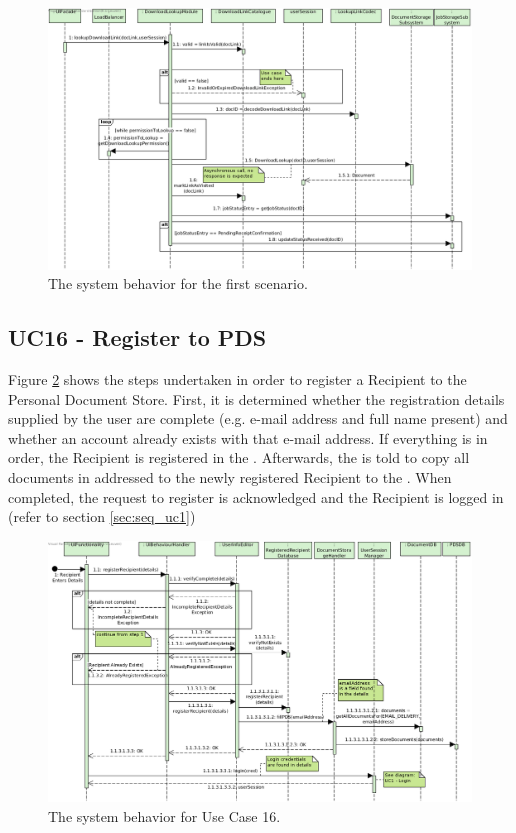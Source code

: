 \begin{figure}[!htp]
    \centering
    \includegraphics[width=\textwidth]{figures/UC15 - Download document via unique link.png}
    \caption{The system behavior for the first scenario.
        }\label{fig:seq_uc15}
\end{figure}

\subsection{UC16 - Register to PDS}
Figure \ref{fig:seq_uc16} shows the steps undertaken in order to register a Recipient to the Personal Document Store. First, it is determined whether the registration details supplied by the user are complete (e.g. e-mail address and full name present) and whether an account already exists with that e-mail address. If everything is in order, the Recipient is registered in the . Afterwards, the  is told to copy all documents in  addressed to the newly registered Recipient to the . When completed, the request to register is acknowledged and the Recipient is logged in (refer to section \ref{sec:seq_uc1})

\begin{figure}[!htp]
    \centering
    \includegraphics[width=\textwidth]{figures/UC16 - Register to PDS.png}
    \caption{The system behavior for Use Case 16.
        }\label{fig:seq_uc16}
\end{figure}

